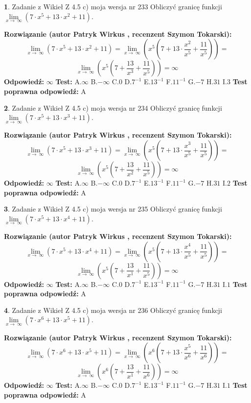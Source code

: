 \documentclass[12pt, a4paper]{article}
\theoremstyle{definition} %
\newtheorem{zad}{}
\newcommand{\zadStart}[1]{\begin{zad}#1\newline}
\newcommand{\zadStop}{\end{zad}}
\newcommand{\rozwStart}[2]{\noindent \textbf{Rozwiązanie (autor #1 , recenzent #2): }\newline}
\newcommand{\rozwStop}{\newline}
\newcommand{\odpStart}{\noindent \textbf{Odpowiedź:}\newline}
\newcommand{\odpStop}{\newline}
\newcommand{\testStart}{\noindent \textbf{Test:}\newline}
\newcommand{\testStop}{\newline}
\newcommand{\kluczStart}{\noindent \textbf{Test poprawna odpowiedź:}\newline}
\newcommand{\kluczStop}{\newline}
\begin{document}
\zadStart{Zadanie z Wikieł Z 4.5 c) moja wersja nr 233}
Obliczyć granicę funkcji  $\lim\limits_{x\to\ \infty}(7 \cdot x^{5}+13 \cdot x^{2}+11)$.
\zadStop
\rozwStart{Patryk Wirkus}{Szymon Tokarski}
$$\lim\limits_{x\to\ \infty}(7 \cdot x^{5}+13 \cdot x^{2}+11) = \lim\limits_{x\to\ \infty}(x^{5}(7 +13 \cdot \frac{x^{2}}{x^{5}}+\frac{11}{x^{5}})) =$$ $$\lim\limits_{x\to\ \infty}(x^{5}(7 +\frac{13}{x^{3}}+\frac{11}{x^{5}})) =\infty$$
\rozwStop
\odpStart
$\infty$
\odpStop
\testStart
A.$\infty$ B.$-\infty$ C.$0$ D.$7^{-1}$ E.$13^{-1}$
F.$11^{-1}$ G.$-7$
H.$31$
I.$3$
\testStop
\kluczStart
A
\kluczStop



\zadStart{Zadanie z Wikieł Z 4.5 c) moja wersja nr 234}
Obliczyć granicę funkcji  $\lim\limits_{x\to\ \infty}(7 \cdot x^{5}+13 \cdot x^{3}+11)$.
\zadStop
\rozwStart{Patryk Wirkus}{Szymon Tokarski}
$$\lim\limits_{x\to\ \infty}(7 \cdot x^{5}+13 \cdot x^{3}+11) = \lim\limits_{x\to\ \infty}(x^{5}(7 +13 \cdot \frac{x^{3}}{x^{5}}+\frac{11}{x^{5}})) =$$ $$\lim\limits_{x\to\ \infty}(x^{5}(7 +\frac{13}{x^{2}}+\frac{11}{x^{5}})) =\infty$$
\rozwStop
\odpStart
$\infty$
\odpStop
\testStart
A.$\infty$ B.$-\infty$ C.$0$ D.$7^{-1}$ E.$13^{-1}$
F.$11^{-1}$ G.$-7$
H.$31$
I.$2$
\testStop
\kluczStart
A
\kluczStop



\zadStart{Zadanie z Wikieł Z 4.5 c) moja wersja nr 235}
Obliczyć granicę funkcji  $\lim\limits_{x\to\ \infty}(7 \cdot x^{5}+13 \cdot x^{4}+11)$.
\zadStop
\rozwStart{Patryk Wirkus}{Szymon Tokarski}
$$\lim\limits_{x\to\ \infty}(7 \cdot x^{5}+13 \cdot x^{4}+11) = \lim\limits_{x\to\ \infty}(x^{5}(7 +13 \cdot \frac{x^{4}}{x^{5}}+\frac{11}{x^{5}})) =$$ $$\lim\limits_{x\to\ \infty}(x^{5}(7 +\frac{13}{x^{1}}+\frac{11}{x^{5}})) =\infty$$
\rozwStop
\odpStart
$\infty$
\odpStop
\testStart
A.$\infty$ B.$-\infty$ C.$0$ D.$7^{-1}$ E.$13^{-1}$
F.$11^{-1}$ G.$-7$
H.$31$
I.$1$
\testStop
\kluczStart
A
\kluczStop



\zadStart{Zadanie z Wikieł Z 4.5 c) moja wersja nr 236}
Obliczyć granicę funkcji  $\lim\limits_{x\to\ \infty}(7 \cdot x^{6}+13 \cdot x^{5}+11)$.
\zadStop
\rozwStart{Patryk Wirkus}{Szymon Tokarski}
$$\lim\limits_{x\to\ \infty}(7 \cdot x^{6}+13 \cdot x^{5}+11) = \lim\limits_{x\to\ \infty}(x^{6}(7 +13 \cdot \frac{x^{5}}{x^{6}}+\frac{11}{x^{6}})) =$$ $$\lim\limits_{x\to\ \infty}(x^{6}(7 +\frac{13}{x^{1}}+\frac{11}{x^{6}})) =\infty$$
\rozwStop
\odpStart
$\infty$
\odpStop
\testStart
A.$\infty$ B.$-\infty$ C.$0$ D.$7^{-1}$ E.$13^{-1}$
F.$11^{-1}$ G.$-7$
H.$31$
I.$1$
\testStop
\kluczStart
A
\kluczStop
\end{document}
